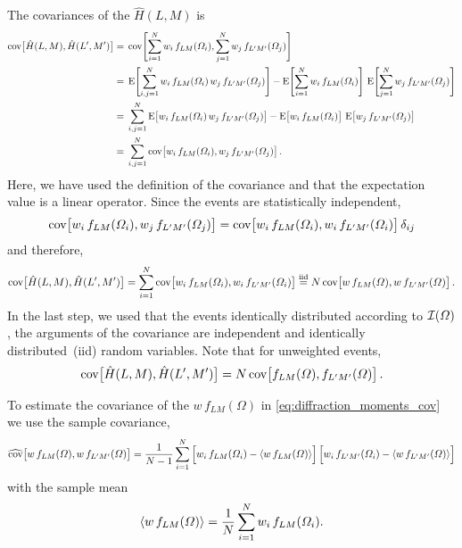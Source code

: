 The covariances of the $\hat{H}(L, M)$ is
\begin{align}
  \cov[1]{\hat{H}(L, M), \hat{H}(L', M')}
  ={}& \cov[4]{\sum_{i = 1}^N w_i\, f_{L M}(\Omega_i), \sum_{j = 1}^N w_j\, f_{L' M'}(\Omega_j)} \nonumber
  \\
  ={}& \exptVal[4]{\sum_{i, j = 1}^N w_i\,f_{L M}(\Omega_i)\,  w_j\, f_{L' M'}(\Omega_j)}
     - \exptVal[4]{\sum_{i = 1}^N w_i\, f_{L M}(\Omega_i)}\, \exptVal[4]{\sum_{j = 1}^N w_j\, f_{L' M'}(\Omega_j)} \nonumber
  \\
  ={}& \sum_{i, j = 1}^N \exptVal[1]{w_i\, f_{L M}(\Omega_i)\, w_j\, f_{L' M'}(\Omega_j)}
     - \exptVal[1]{w_i\, f_{L M}(\Omega_i)}\, \exptVal[1]{w_j\, f_{L' M'}(\Omega_j)} \nonumber
  \\
  ={}& \sum_{i, j = 1}^N \cov[1]{w_i\, f_{L M}(\Omega_i), w_j\, f_{L' M'}(\Omega_j)}.
\end{align}
Here, we have used the definition of the covariance and that the
expectation value is a linear operator.  Since the events are
statistically independent,
\begin{equation}
  \cov[1]{w_i\, f_{L M}(\Omega_i), w_j\, f_{L' M'}(\Omega_j)}
  = \cov[1]{w_i\, f_{L M}(\Omega_i), w_i\, f_{L' M'}(\Omega_i)} \delta_{i j}
\end{equation}
and therefore,
\begin{equation}
  \label{eq:diffraction_moments_cov}
  \cov[1]{\hat{H}(L, M), \hat{H}(L', M')}
  = \sum_{i = 1}^N \cov[1]{w_i\, f_{L M}(\Omega_i), w_i\, f_{L' M'}(\Omega_i)}
  \equalUsing{\text{iid}} N \cov[1]{w\, f_{L M}(\Omega), w\, f_{L' M'}(\Omega)}.
\end{equation}
In the last step, we used that the events identically distributed
according to $\mathcal{I}(\Omega)$, \ie the arguments of the covariance
are independent and identically distributed~(iid) random variables.
Note that for unweighted events,
\begin{equation}
  \label{eq:diffraction_moments_cov_unweighted}
  \cov[1]{\hat{H}(L, M), \hat{H}(L', M')}
  =  N \cov[1]{f_{L M}(\Omega), f_{L' M'}(\Omega)}.
\end{equation}

To estimate the covariance of the $w\, f_{L M}(\Omega)$ in
\cref{eq:diffraction_moments_cov} we use the sample
covariance, \ie
\begin{equation}
  \label{eq:diffraction_base_fcn_cov}
  \covEst[1]{w\, f_{L M}(\Omega), w\, f_{L' M'}(\Omega)}
  = \frac{1}{N - 1} \sum_{i = 1}^N
  \sBrk[2]{w_i\, f_{L M}(\Omega_i) - \mean{w\, f_{L M}(\Omega)}} \sBrk[2]{w_i\, f_{L' M'}(\Omega_i) - \mean{w\, f_{L' M'}(\Omega)}}
\end{equation}
with the sample mean
\begin{equation}
  \label{eq:diffraction_w_f_sample_mean}
  \mean{w\, f_{L M}(\Omega)}
  = \frac{1}{N} \sum_{i = 1}^N w_i\, f_{L M}(\Omega_i).
\end{equation}


